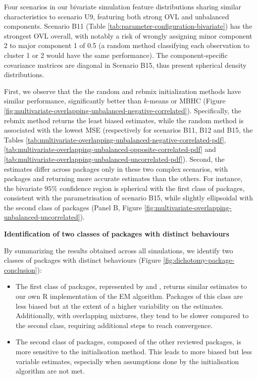 Four scenarios in our bivariate simulation feature distributions sharing similar characteristics to scenario U9, featuring both strong OVL and unbalanced components. Scenario B11 (Table \ref{tab:parameter-configuration-bivariate}) has the strongest OVL overall, with notably a risk of wrongly assigning minor component 2 to major component 1 of 0.5 (a random method classifying each observation to cluster 1 or 2 would have the same performance). The component-specific covariance matrices are diagonal in Scenario B15, thus present spherical density distributions.

First, we observe that the the random and rebmix initialization methods have similar performance, significantly better than \(k\)-means or MBHC (Figure \ref{fig:multivariate-overlapping-unbalanced-negative-correlated}). Specifically, the rebmix method returns the least biased estimates, while the random method is associated with the lowest MSE (respectively for scenarios B11, B12 and B15, the Tables \ref{tab:multivariate-overlapping-unbalanced-negative-correlated-pdf},
\ref{tab:multivariate-overlapping-unbalanced-opposite-correlated-pdf}
and \ref{tab:multivariate-overlapping-unbalanced-uncorrelated-pdf}). Second, the estimates differ across packages only in these two complex scenarios, with packages  and  returning more accurate estimates than the others. For instance, the bivariate \(95\%\) confidence region is spherical with the first class of packages, consistent with the parametrisation of scenario B15, while slightly ellipsoidal with the second class of packages (Panel B, Figure \ref{fig:multivariate-overlapping-unbalanced-uncorrelated}).

\textbf{Identification of two classes of packages with distinct behaviours}

By summarizing the results obtained across all simulations, we identify two classes of packages with distinct behaviours (Figure
\ref{fig:dichotomy-package-conclusion}):

\begin{itemize}
\item
  The first class of packages, represented by  and , returns similar estimates to our own R implementation of the EM algorithm. Packages of this class are less biased but at the extent of a higher variability on the estimates. Additionally, with overlapping mixtures, they tend to be
  slower compared to the second class, requiring additional steps to reach
  convergence.
\item
  The second class of packages, composed of the other
  reviewed packages, is more sensitive to the initialisation method. This leads to more
  biased but less variable estimates, especially when assumptions done by
  the initialisation algorithm are not met.
\end{itemize}

